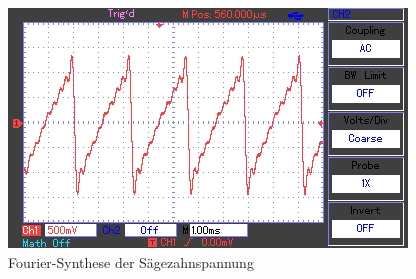 	\begin{figure}[h]
		\begin{center}
		\includegraphics[scale=1.0]{picfss.jpg}
		\caption{Fourier-Synthese der Sägezahnspannung}
		\label{picfss}
		\end{center}	
	\end{figure}